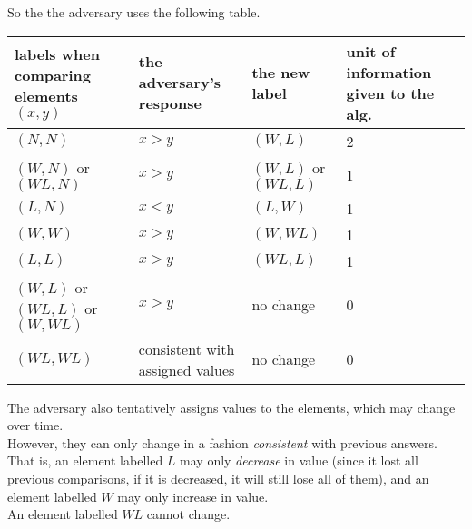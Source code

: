 \documentclass[12pt]{article}
\theoremstyle{plain}
\theoremstyle{definition}
\begin{document}
So the the adversary uses the following table. \\
\begin{table}[H]
  \centering
  \begin{tabular}{C{3cm}  C{3cm}  C{3cm}  C{3cm}}
  \hline
  labels when comparing elements $(x, y)$ & the adversary's response & the new label & unit of information given to the alg. \\ \hline \hline
  $(N, N)$ & $x > y$ & $(W, L)$ & 2 \\ \hline
  $(W, N)$ or $(WL, N)$ & $x > y$ & $(W, L)$ or $(WL, L)$ & 1 \\ \hline
  $(L, N)$ & $x < y$ & $(L, W)$ & 1 \\ \hline
  $(W, W)$ & $x > y$ & $(W, WL)$ & 1 \\ \hline
  $(L, L)$ & $x > y$ & $(WL, L)$ & 1 \\ \hline
  $(W, L)$ or $(WL, L)$ or $(W, WL)$ & $x > y$ & no change & 0 \\ \hline
  $(WL, WL)$ & consistent with assigned values & no change & 0
  \end{tabular}
\end{table}
The adversary also tentatively assigns values to the elements, which may change over time. \\
However, they can only change in a fashion \emph{consistent} with previous answers.
That is, an element labelled $L$ may only \emph{decrease} in value (since it lost all previous comparisons, if it is decreased, it will still lose all of them), and an element labelled $W$ may only increase in value. \\
An element labelled $WL$ cannot change. \\
\end{document}
